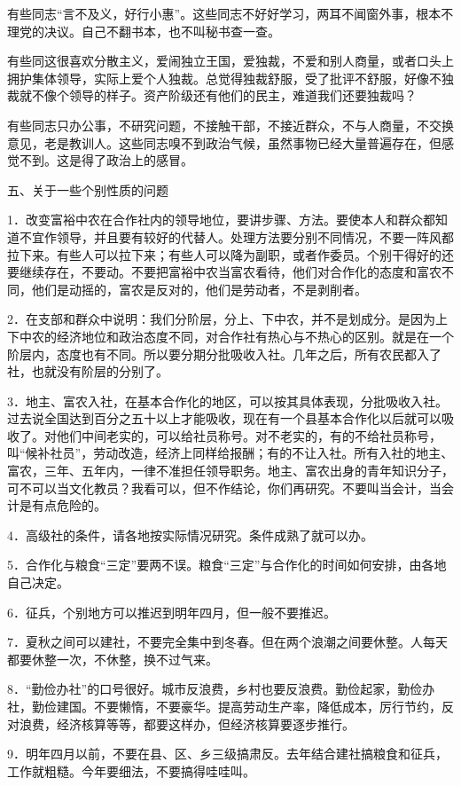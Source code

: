 有些同志“言不及义，好行小惠”。这些同志不好好学习，两耳不闻窗外事，根本不理党的决议。自己不翻书本，也不叫秘书查一查。

有些同这很喜欢分散主义，爱闹独立王国，爱独裁，不爱和别人商量，或者口头上拥护集体领导，实际上爱个人独裁。总觉得独裁舒服，受了批评不舒服，好像不独裁就不像个领导的样子。资产阶级还有他们的民主，难道我们还要独裁吗？

有些同志只办公事，不研究问题，不接触干部，不接近群众，不与人商量，不交换意见，老是教训人。这些同志嗅不到政治气候，虽然事物已经大量普遍存在，但感觉不到。这是得了政治上的感冒。

五、关于一些个别性质的问题

1．改变富裕中农在合作社内的领导地位，要讲步骤、方法。要使本人和群众都知道不宜作领导，并且要有较好的代替人。处理方法要分别不同情况，不要一阵风都拉下来。有些人可以拉下来；有些人可以降为副职，或者作委员。个别干得好的还要继续存在，不要动。不要把富裕中农当富农看待，他们对合作化的态度和富农不同，他们是动摇的，富农是反对的，他们是劳动者，不是剥削者。

2．在支部和群众中说明：我们分阶层，分上、下中农，并不是划成分。是因为上下中农的经济地位和政治态度不同，对合作社有热心与不热心的区别。就是在一个阶层内，态度也有不同。所以要分期分批吸收入社。几年之后，所有农民都入了社，也就没有阶层的分别了。

3．地主、富农入社，在基本合作化的地区，可以按其具体表现，分批吸收入社。过去说全国达到百分之五十以上才能吸收，现在有一个县基本合作化以后就可以吸收了。对他们中间老实的，可以给社员称号。对不老实的，有的不给社员称号，叫“候补社员”，劳动改造，经济上同样给报酬；有的不让入社。所有入社的地主、富农，三年、五年内，一律不准担任领导职务。地主、富农出身的青年知识分子，可不可以当文化教员？我看可以，但不作结论，你们再研究。不要叫当会计，当会计是有点危险的。

4．高级社的条件，请各地按实际情况研究。条件成熟了就可以办。

5．合作化与粮食“三定”要两不误。粮食“三定”与合作化的时间如何安排，由各地自己决定。

6．征兵，个别地方可以推迟到明年四月，但一般不要推迟。

7．夏秋之间可以建社，不要完全集中到冬春。但在两个浪潮之间要休整。人每天都要休整一次，不休整，换不过气来。

8．“勤俭办社”的口号很好。城市反浪费，乡村也要反浪费。勤俭起家，勤俭办社，勤俭建国。不要懒惰，不要豪华。提高劳动生产率，降低成本，厉行节约，反对浪费，经济核算等等，都要这样办，但经济核算要逐步推行。

9．明年四月以前，不要在县、区、乡三级搞肃反。去年结合建社搞粮食和征兵，工作就粗糙。今年要细法，不要搞得哇哇叫。

